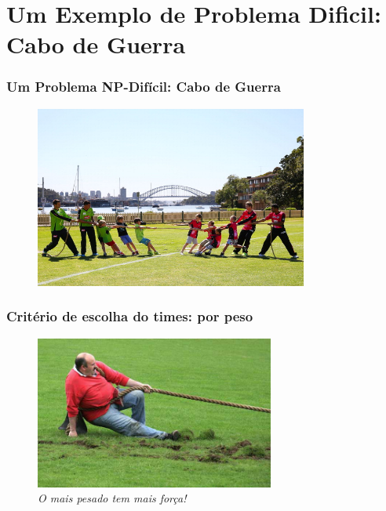 \documentclass{beamer}
\begin{document}
\section{Um Exemplo de Problema Dificil: Cabo de Guerra}

\begin{frame}
\frametitle{Um Problema NP-Difícil: Cabo de Guerra}

\begin{figure}[ht!]
 \centering
 \includegraphics[width=0.8\textwidth , height=0.7\textheight]{figures/cabo-de-guerra.jpg}
\end{figure}


\end{frame}


\begin{frame}[fragile]
\frametitle{Critério de escolha do times: por peso}

\begin{figure}[ht!]
 \centering
 \includegraphics[width=0.7\textwidth , height=0.7\textheight]{figures/separar_por_peso02.jpg}
\caption{\textit{O mais pesado tem mais força!}} 
\end{figure}

\end{frame}
\end{document}

